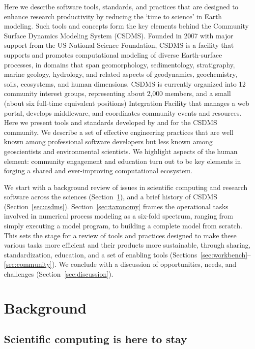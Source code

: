 \documentclass{article} %
\begin{document}
Here we describe software tools, standards, and practices that are designed to enhance research productivity by reducing the `time to science' in Earth modeling. Such tools and concepts form the key elements behind the Community Surface Dynamics Modeling System (CSDMS). Founded in 2007 with major support from the US National Science Foundation, CSDMS is a facility that supports and promotes computational modeling of diverse Earth-surface processes, in domains that span geomorphology, sedimentology, stratigraphy, marine geology, hydrology, and related aspects of geodynamics, geochemistry, soils, ecosystems, and human dimensions. CSDMS is currently organized into 12 community interest groups, representing about 2,000 members, and a small (about six full-time equivalent positions) Integration Facility that manages a web portal, develops middleware, and coordinates community events and resources. Here we present tools and standards developed by and for the CSDMS community. We describe a set of effective engineering practices that are well known among professional software developers but less known among geoscientists and environmental scientists. We highlight aspects of the human element: community engagement and education turn out to be key elements in forging a shared and ever-improving computational ecosystem.

We start with a background review of issues in scientific computing and research software across the sciences (Section~\ref{sec:background}), and a brief history of CSDMS (Section~\ref{sec:csdms}). Section~\ref{sec:taxonomy} frames the operational tasks involved in numerical process modeling as a six-fold spectrum, ranging from simply executing a model program, to building a complete model from scratch. This sets the stage for a review of tools and practices designed to make these various tasks more efficient and their products more sustainable, through sharing, standardization, education, and a set of enabling tools (Sections~\ref{sec:workbench}--\ref{sec:community}). We conclude with a discussion of opportunities, needs, and challenges (Section~\ref{sec:discussion}).


\section{Background}
\label{sec:background}

\subsection{Scientific computing is here to stay}
\end{document}
